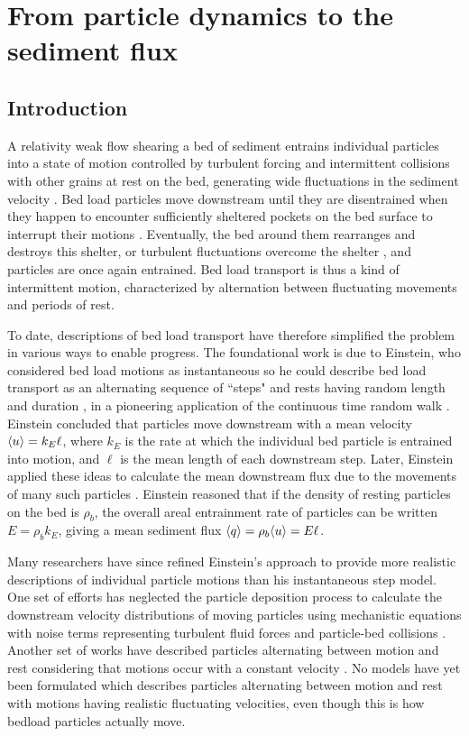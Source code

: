 
\chapter{From particle dynamics to the sediment flux}
\label{ch:flux}
\section{Introduction}

A relativity weak flow shearing a bed of sediment entrains individual particles into a state of motion controlled by turbulent forcing and intermittent collisions with other grains at rest on the bed, generating wide fluctuations in the sediment velocity \citep{Heyman2016,Fathel2015}.
Bed load particles move downstream until they are disentrained when they happen to encounter sufficiently sheltered pockets on the bed surface to interrupt their motions \citep{Charru2004,Gordon1972}.
Eventually, the bed around them rearranges and destroys this shelter, or turbulent fluctuations overcome the shelter \citep{Celik2014,Valyrakis2010}, and particles are once again entrained.
Bed load transport is thus a kind of intermittent motion, characterized by alternation between fluctuating movements and periods of rest.

To date, descriptions of bed load transport have therefore simplified the problem in various ways to enable progress.
The foundational work is due to Einstein, who considered bed load motions as instantaneous so he could describe bed load transport as an alternating sequence of ``steps" and rests having random length and duration \citep{Einstein1937}, in a pioneering application of the continuous time random walk \citep{Montroll1965}.
Einstein concluded that particles move downstream with a mean velocity $\langle u \rangle = k_E \ell$, where $k_E$ is the rate at which the individual bed particle is entrained into motion, and $\ell$ is the mean length of each downstream step.
Later, Einstein applied these ideas to calculate the mean downstream flux due to the movements of many such particles \citep{Einstein1950}. Einstein reasoned that if the density of resting particles on the bed is $\rho_b$, the overall areal entrainment rate of particles can be written $E = \rho_b k_E$, giving a mean sediment flux $\langle q \rangle = \rho_b \langle u \rangle  = E \ell $.

Many researchers have since refined Einstein's approach to provide more realistic descriptions of individual particle motions than his instantaneous step model.
One set of efforts has neglected the particle deposition process to calculate the downstream velocity distributions of moving particles using mechanistic equations with noise terms representing turbulent fluid forces and particle-bed collisions \citep{Ancey2014,Fan2014}. 
Another set of works have described particles alternating between motion and rest considering that motions occur with a constant velocity \citep{Lisle1998,Lajeunesse2017}. 
No models have yet been formulated which describes particles alternating between motion and rest with motions having realistic fluctuating velocities, even though this is how bedload particles actually move.

